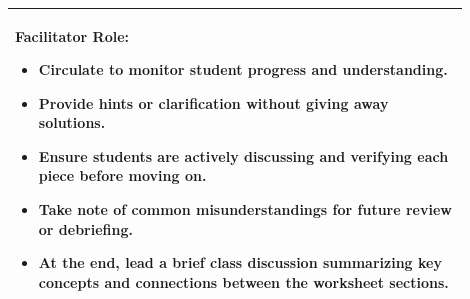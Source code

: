 \documentclass{article}
\begin{document}
\begin{tabular}{|p{0.9\linewidth}|}
\textbf{Facilitator Role:}  
\begin{itemize}  
    \item Circulate to monitor student progress and understanding.  
    \item Provide hints or clarification without giving away solutions.  
    \item Ensure students are actively discussing and verifying each piece before moving on.  
    \item Take note of common misunderstandings for future review or debriefing.  
    \item At the end, lead a brief class discussion summarizing key concepts and connections between the worksheet sections.  
\end{itemize}  
\vspace{0.2cm}
\\ \hline
\end{tabular}
\newpage
\end{document}
